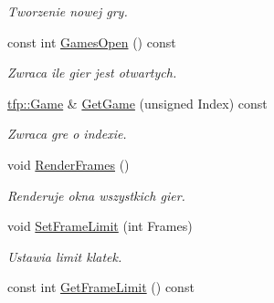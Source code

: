 \begin{DoxyCompactItemize}
\begin{DoxyCompactList}\small\item\em Tworzenie nowej gry. \end{DoxyCompactList}\item 
\mbox{\label{classtfp_1_1_game_manager_class_ab4ccbd9de670aa51f0cd5dd32638dc91}} 
const int \mbox{\hyperlink{classtfp_1_1_game_manager_class_ab4ccbd9de670aa51f0cd5dd32638dc91}{Games\+Open}} () const
\begin{DoxyCompactList}\small\item\em Zwraca ile gier jest otwartych. \end{DoxyCompactList}\item 
\mbox{\label{classtfp_1_1_game_manager_class_ac3d26a4d05d5609afdaefd053cfcc08b}} 
\mbox{\hyperlink{classtfp_1_1_game}{tfp\+::\+Game}} \& \mbox{\hyperlink{classtfp_1_1_game_manager_class_ac3d26a4d05d5609afdaefd053cfcc08b}{Get\+Game}} (unsigned Index) const
\begin{DoxyCompactList}\small\item\em Zwraca gre o indexie. \end{DoxyCompactList}\item 
\mbox{\label{classtfp_1_1_game_manager_class_ab3d3568ea84a74d211038f73864701ed}} 
void \mbox{\hyperlink{classtfp_1_1_game_manager_class_ab3d3568ea84a74d211038f73864701ed}{Render\+Frames}} ()
\begin{DoxyCompactList}\small\item\em Renderuje okna wszystkich gier. \end{DoxyCompactList}\item 
\mbox{\label{classtfp_1_1_game_manager_class_acc79a765fc50a7f10fd01d8065e1058a}} 
void \mbox{\hyperlink{classtfp_1_1_game_manager_class_acc79a765fc50a7f10fd01d8065e1058a}{Set\+Frame\+Limit}} (int Frames)
\begin{DoxyCompactList}\small\item\em Ustawia limit klatek. \end{DoxyCompactList}\item 
\mbox{\label{classtfp_1_1_game_manager_class_aebda2fc50d3a9d4593a92da9b8b425de}} 
const int \mbox{\hyperlink{classtfp_1_1_game_manager_class_aebda2fc50d3a9d4593a92da9b8b425de}{Get\+Frame\+Limit}} () const

\end{DoxyCompactItemize}
